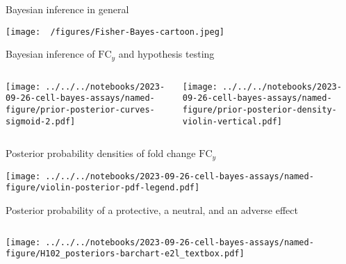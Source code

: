 \documentclass[aspectratio=169]{beamer}
\begin{document}
\begin{frame}{Bayesian inference in general}

\texttt{[image: ~/figures/Fisher-Bayes-cartoon.jpeg]}
\end{frame}

\begin{frame}{Bayesian inference of $\mathrm{FC}_y$ and hypothesis testing}
\begin{columns}[t]
\begin{column}{0.5\textwidth}

\texttt{[image: ../../../notebooks/2023-09-26-cell-bayes-assays/named-figure/prior-posterior-curves-sigmoid-2.pdf]}
\end{column}
\begin{column}{0.5\textwidth}

\texttt{[image: ../../../notebooks/2023-09-26-cell-bayes-assays/named-figure/prior-posterior-density-violin-vertical.pdf]}
\end{column}
\end{columns}
\end{frame}

\begin{frame}{Posterior probability densities of fold change $\mathrm{FC}_y$}
\begin{center}
\texttt{[image: ../../../notebooks/2023-09-26-cell-bayes-assays/named-figure/violin-posterior-pdf-legend.pdf]}
\end{center}
\end{frame}

\begin{frame}{Posterior probability of a protective, a neutral, and an adverse effect}%
\begin{columns}[t]
\begin{column}{0.5\textwidth}

\texttt{[image: ../../../notebooks/2023-09-26-cell-bayes-assays/named-figure/H102\_posteriors-barchart-e2l\_textbox.pdf]}
\end{column}

\begin{column}{0.5\textwidth}

\end{column}
\end{columns}
\end{frame}
\end{document}
